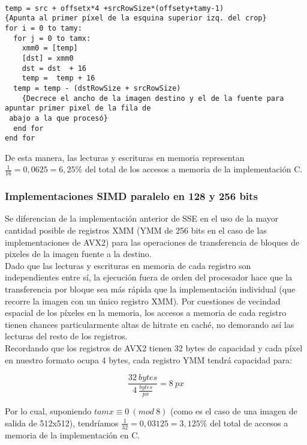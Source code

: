 \begin{codesnippet}
\begin{verbatim}

temp = src + offsetx*4 +srcRowSize*(offsety+tamy-1)       
{Apunta al primer píxel de la esquina superior izq. del crop}
for i = 0 to tamy:  
  for j = 0 to tamx:  
    xmm0 = [temp]
    [dst] = xmm0 
    dst = dst  + 16 
    temp =  temp + 16 
  temp = temp - (dstRowSize + srcRowSize)       
	{Decrece el ancho de la imagen destino y el de la fuente para apuntar primer pixel de la fila de
 abajo a la que procesó}    
  end for 
end for 

\end{verbatim}
\end{codesnippet}



De esta manera, las lecturas y escrituras en memoria representan $\frac{1}{16} = 0,0625 =  6,25\%$ del total de los accesos a memoria de la implementación C.


\subsubsection{Implementaciones SIMD paralelo en 128 y 256 bits}
Se diferencian de la implementación anterior de SSE en el uso de la mayor cantidad posible de registros XMM (YMM de 256 bits en el caso de las implementaciones de AVX2) para las operaciones de transferencia de bloques de pixeles de la imagen fuente a la destino. 
\\

Dado que las lecturas y escrituras en memoria de cada registro son independientes entre sí, la ejecución fuera de orden del procesador hace que la transferencia por bloque sea más rápida que la implementación individual (que recorre la imagen con un único registro XMM). Por cuestiones de vecindad espacial de los píxeles en la memoria, los accesos a memoria de cada registro tienen chances particularmente altas de hitrate en caché, no demorando así las lecturas del resto de los registros.
\\

Recordando que los registros de AVX2 tienen 32 bytes de capacidad y cada píxel en nuestro formato ocupa 4 bytes, cada registro YMM tendrá capacidad para:

$$ \frac{32 \ bytes}{4 \ \frac{bytes}{px}} = 8 \ px $$

Por lo cual, suponiendo $ tamx \equiv 0 \ (mod \ 8) $ (como es el caso de una imagen de salida de 512x512), tendríamos $\frac{1}{32} = 0,03125 =  3,125\%$ del total de accesos a memoria de la implementación en C.

